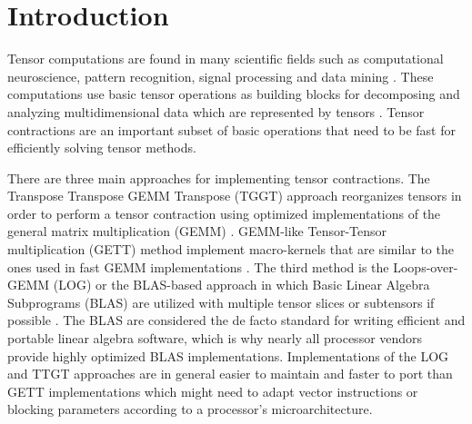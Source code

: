 \section{Introduction}
\label{sec:introduction}
Tensor computations are found in many scientific fields such as computational neuroscience, pattern recognition, signal processing and data mining \citep{karahan:2015:tensor, papalexakis:2017:tensors, song:2019:tensor.completion, rieser:2023:tensor, wang:2023:tensor.decomposition}.
These computations use basic tensor operations as building blocks for decomposing and analyzing multidimensional data which are represented by tensors \citep{lee:2018:fundamental, kolda:2009:decompositions}. 
Tensor contractions are an important subset of basic operations that need to be fast for efficiently solving tensor methods.

There are three main approaches for implementing tensor contractions.
The Transpose Transpose GEMM Transpose (TGGT) approach reorganizes tensors in order to perform a tensor contraction using optimized implementations of the general matrix multiplication (GEMM) \citep{bader:2006:algorithm862,solomonik:2013:cyclops}.
GEMM-like Tensor-Tensor multiplication (GETT) method implement macro-kernels that are similar to the ones used in fast GEMM implementations \citep{springer:2018:design, matthews:2018:high}.
The third method is the Loops-over-GEMM (LOG) or the BLAS-based approach in which Basic Linear Algebra Subprograms (BLAS) are utilized with multiple tensor slices or subtensors if possible \citep{dinapoli:2014:towards.efficient.use, li:2015:input, shi:2016:tensor.contraction, bassoy:2019:ttv}.
The BLAS are considered the de facto standard for writing efficient and portable linear algebra software, which is why nearly all processor vendors provide highly optimized BLAS implementations.
Implementations of the LOG and TTGT approaches are in general easier to maintain and faster to port than GETT implementations which might need to adapt vector instructions or blocking parameters according to a processor's microarchitecture.


